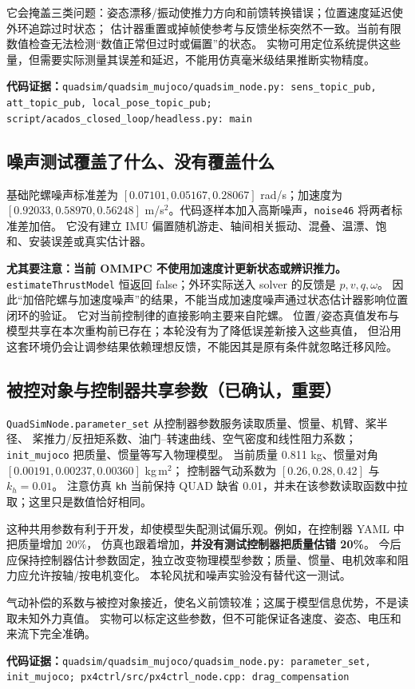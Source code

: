 \documentclass[UTF8,a4paper,11pt,fontset=fandol]{ctexart}
\newcommand{\code}[1]{{\small\nolinkurl{#1}}}
\newcommand{\source}[1]{\par\noindent\textbf{代码证据：}\code{#1}\par}
\begin{document}
它会掩盖三类问题：姿态漂移/振动使推力方向和前馈转换错误；位置速度延迟使外环追踪过时状态；
估计器重置或掉帧使参考与反馈坐标突然不一致。当前有限数值检查无法检测“数值正常但过时或偏置”的状态。
实物可用定位系统提供这些量，但需要实际测量其误差和延迟，不能用仿真毫米级结果推断实物精度。
\source{quadsim/quadsim_mujoco/quadsim_node.py: sens_topic_pub, att_topic_pub, local_pose_topic_pub; script/acados_closed_loop/headless.py: main}

\subsection{噪声测试覆盖了什么、没有覆盖什么}
基础陀螺噪声标准差为 $[0.07101,0.05167,0.28067]$ rad/s；加速度为
$[0.92033,0.58970,0.56248]$ m/s$^2$。代码逐样本加入高斯噪声，\code{noise46} 将两者标准差加倍。
它没有建立 IMU 偏置随机游走、轴间相关振动、混叠、温漂、饱和、安装误差或真实估计器。

\textbf{尤其要注意：当前 OMMPC 不使用加速度计更新状态或辨识推力。}
\code{estimateThrustModel} 恒返回 false；外环实际送入 solver 的反馈是 $p,v,q,\omega$。
因此“加倍陀螺与加速度噪声”的结果，不能当成加速度噪声通过状态估计器影响位置闭环的验证。
它对当前控制律的直接影响主要来自陀螺。
位置/姿态真值发布与模型共享在本次重构前已存在；本轮没有为了降低误差新接入这些真值，
但沿用这套环境仍会让调参结果依赖理想反馈，不能因其是原有条件就忽略迁移风险。

\subsection{被控对象与控制器共享参数（已确认，重要）}
\code{QuadSimNode.parameter_set} 从控制器参数服务读取质量、惯量、机臂、桨半径、
桨推力/反扭矩系数、油门--转速曲线、空气密度和线性阻力系数；\code{init_mujoco} 把质量、惯量等写入物理模型。
当前质量 0.811 kg、惯量对角 $[0.00191,0.00237,0.00360]$ kg\,m$^2$；
控制器气动系数为 $[0.26,0.28,0.42]$ 与 $k_h=0.01$。
注意仿真 \code{kh} 当前保持 QUAD 缺省 0.01，并未在该参数读取函数中拉取；这里只是数值恰好相同。

这种共用参数有利于开发，却使模型失配测试偏乐观。例如，在控制器 YAML 中把质量增加 20\%，
仿真也跟着增加，\textbf{并没有测试控制器把质量估错 20\%}。
今后应保持控制器估计参数固定，独立改变物理模型参数；质量、惯量、电机效率和阻力应允许按轴/按电机变化。
本轮风扰和噪声实验没有替代这一测试。

气动补偿的系数与被控对象接近，使名义前馈较准；这属于模型信息优势，不是读取未知外力真值。
实物可以标定这些参数，但不可能保证各速度、姿态、电压和来流下完全准确。
\source{quadsim/quadsim_mujoco/quadsim_node.py: parameter_set, init_mujoco; px4ctrl/src/px4ctrl_node.cpp: drag_compensation}
\end{document}
